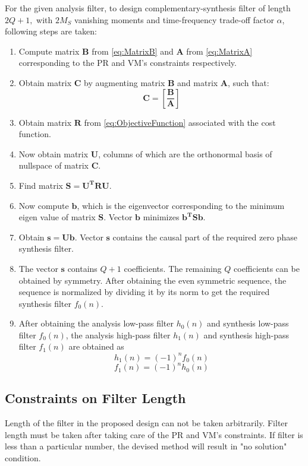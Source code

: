 For the given analysis filter, to design complementary-synthesis filter of length $2Q+1,$ with $2M_{S}$ vanishing moments and time-frequency trade-off factor $\alpha$, following steps are taken:
\begin{enumerate}
\item Compute matrix $\mathbf{B}$ from \ref{eq:MatrixB} and $\mathbf{A}$ from \ref{eq:MatrixA} corresponding to the PR and VM's constraints respectively.
\item  Obtain matrix $\mathbf{C}$ by augmenting matrix $\mathbf{B}$ and matrix $\mathbf{A}$, such
that: \[
\mathbf{C}=\left[\mathbf{\frac{B}{A}}\right]\]
\item Obtain matrix $\mathbf{R}$ from \ref{eq:ObjectiveFunction} associated with the cost function.
\item Now obtain matrix $\mathbf{U}$, columns of which are the orthonormal basis of nullspace of matrix $\mathbf{C}$.
\item Find matrix $\mathbf{S=U^{T}RU}$.
\item Now compute $\mathbf{b}$, which is the eigenvector corresponding to the minimum eigen value of matrix $\mathbf{S}$. Vector $\mathbf{b}$ minimizes $\mathbf{b^{T}Sb}$.
\item Obtain $\mathbf{s=Ub}$. Vector $\mathbf{s}$ contains the causal part of the required zero phase synthesis filter.
\item The vector $\mathbf{s}$ contains $Q+1$ coefficients. The remaining $Q$ coefficients can be obtained by symmetry. After obtaining the even symmetric sequence, the sequence is normalized by dividing it by its norm to get the required synthesis filter ${f_0(n)}$.
\item After obtaining the analysis low-pass filter $h_0(n)$ and synthesis low-pass filter $f_0(n)$, the analysis high-pass filter $h_1(n)$ and synthesis high-pass filter $f_1(n)$ are obtained as $$ h_1(n) = (-1)^n f_0(n)$$ $$f_1(n) = (-1)^n h_0(n) $$

\end{enumerate}
\subsection{\label{sub:Constraint-on-the length of filter}Constraints on Filter Length}
Length of  the filter in the proposed design can not be taken arbitrarily. Filter length must be taken after taking care of the PR and VM's constraints. If filter is less than a particular number, the devised method will result in {} "no solution" condition.

